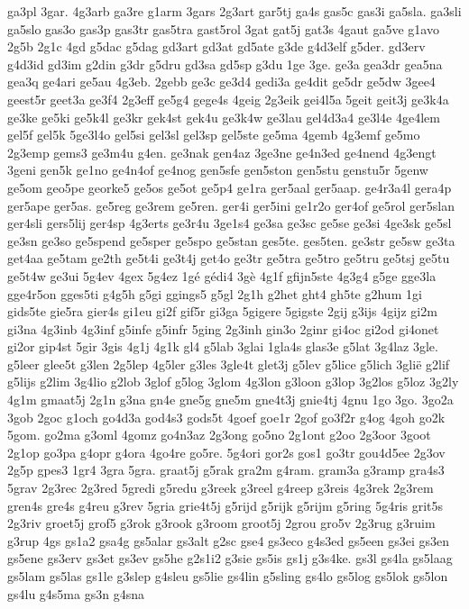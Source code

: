 {ga3pl
3gar.
4g3arb
ga3re
g1arm
3gars
2g3art
gar5tj
ga4s
gas5c
gas3i
ga5sla.
ga3sli
ga5slo
gas3o
gas3p
gas3tr
gas5tra
gast5rol
3gat
gat5j
gat3s
4gaut
ga5ve
g1avo
2g5b
2g1c
4gd
g5dac
g5dag
gd3art
gd3at
gd5ate
g3de
g4d3elf
g5der.
gd3erv
g4d3id
gd3im
g2din
g3dr
g5dru
gd3sa
gd5sp
g3du
1ge
3ge.
ge3a
gea3dr
gea5na
gea3q
ge4ari
ge5au
4g3eb.
2gebb
ge3c
ge3d4
gedi3a
ge4dit
ge5dr
ge5dw
3gee4
geest5r
geet3a
ge3f4
2g3eff
ge5g4
gege4s
4geig
2g3eik
gei4l5a
5geit
geit3j
ge3k4a
ge3ke
ge5ki
ge5k4l
ge3kr
gek4st
gek4u
ge3k4w
ge3lau
gel4d3a4
ge3l4e
4ge4lem
gel5f
gel5k
5ge3l4o
gel5si
gel3sl
gel3sp
gel5ste
ge5ma
4gemb
4g3emf
ge5mo
2g3emp
gems3
ge3m4u
g4en.
ge3nak
gen4az
3ge3ne
ge4n3ed
ge4nend
4g3engt
3geni
gen5k
ge1no
ge4n4of
ge4nog
gen5sfe
gen5ston
gen5stu
genstu5r
5genw
ge5om
geo5pe
georke5
ge5os
ge5ot
ge5p4
ge1ra
ger5aal
ger5aap.
ge4r3a4l
gera4p
ger5ape
ger5as.
ge5reg
ge3rem
ge5ren.
ger4i
ger5ini
ge1r2o
ger4of
ge5rol
ger5slan
ger4sli
gers5lij
ger4sp
4g3erts
ge3r4u
3ge1s4
ge3sa
ge3sc
ge5se
ge3si
4ge3sk
ge5sl
ge3sn
ge3so
ge5spend
ge5sper
ge5spo
ge5stan
ges5te.
ges5ten.
ge3str
ge5sw
ge3ta
get4aa
ge5tam
ge2th
ge5t4i
ge3t4j
get4o
ge3tr
ge5tra
ge5tro
ge5tru
ge5tsj
ge5tu
ge5t4w
ge3ui
5g4ev
4gex
5g4ez
1gé
gédi4
3gè
4g1f
gfijn5ste
4g3g4
g5ge
gge3la
gge4r5on
gges5ti
g4g5h
g5gi
ggings5
g5gl
2g1h
g2het
ght4
gh5te
g2hum
1gi
gids5te
gie5ra
gier4s
gi1eu
gi2f
gif5r
gi3ga
5gigere
5gigste
2gij
g3ijs
4gijz
gi2m
gi3na
4g3inb
4g3inf
g5infe
g5infr
5ging
2g3inh
gin3o
2ginr
gi4oc
gi2od
gi4onet
gi2or
gip4st
5gir
3gis
4g1j
4g1k
gl4
g5lab
3glai
1gla4s
glas3e
g5lat
3g4laz
3gle.
g5leer
glee5t
g3len
2g5lep
4g5ler
g3les
3gle4t
glet3j
g5lev
g5lice
g5lich
3glië
g2lif
g5lijs
g2lim
3g4lio
g2lob
3glof
g5log
3glom
4g3lon
g3loon
g3lop
3g2los
g5loz
3g2ly
4g1m
gmaat5j
2g1n
g3na
gn4e
gne5g
gne5m
gne4t3j
gnie4tj
4gnu
1go
3go.
3go2a
3gob
2goc
g1och
go4d3a
god4s3
gods5t
4goef
goe1r
2gof
go3f2r
g4og
4goh
go2k
5gom.
go2ma
g3oml
4gomz
go4n3az
2g3ong
go5no
2g1ont
g2oo
2g3oor
3goot
2g1op
go3pa
g4opr
g4ora
4go4re
go5re.
5g4ori
gor2s
gos1
go3tr
gou4d5ee
2g3ov
2g5p
gpes3
1gr4
3gra
5gra.
graat5j
g5rak
gra2m
g4ram.
gram3a
g3ramp
gra4s3
5grav
2g3rec
2g3red
5gredi
g5redu
g3reek
g3reel
g4reep
g3reis
4g3rek
2g3rem
gren4s
gre4s
g4reu
g3rev
5gria
grie4t5j
g5rijd
g5rijk
g5rijm
g5ring
5g4ris
grit5s
2g3riv
groet5j
grof5
g3rok
g3rook
g3room
groot5j
2grou
gro5v
2g3rug
g3ruim
g3rup
4gs
gs1a2
gsa4g
gs5alar
gs3alt
g2sc
gse4
gs3eco
g4s3ed
gs5een
gs3ei
gs3en
gs5ene
gs3erv
gs3et
gs3ev
gs5he
g2s1i2
g3sie
gs5is
gs1j
g3s4ke.
gs3l
gs4la
gs5laag
gs5lam
gs5las
gs1le
g3slep
g4sleu
gs5lie
gs4lin
g5sling
gs4lo
gs5log
gs5lok
gs5lon
gs4lu
g4s5ma
gs3n
g4sna
}
